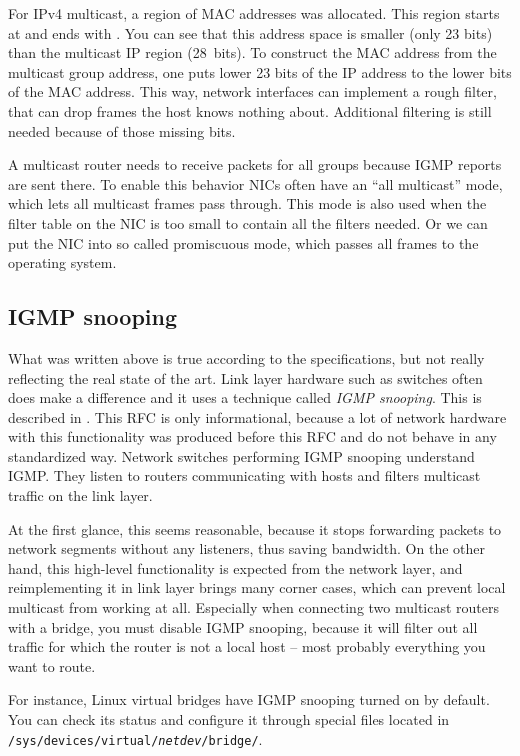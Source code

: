 For IPv4 multicast, a region of MAC addresses was allocated. This region starts
at  and ends with . You can see
that this address space is smaller (only 23 bits) than the multicast IP region
(28~bits). To construct the MAC address from the multicast group address, one
puts lower 23 bits of the IP address to the lower bits of the MAC address. This
way, network interfaces can implement a rough filter, that can drop frames the
host knows nothing about. Additional filtering is still needed because of those
missing bits.

A multicast router needs to receive packets for all groups because IGMP reports
are sent there. To enable this behavior NICs often have an ``all multicast''
mode, which lets all multicast frames pass through. This mode is also used when
the filter table on the NIC is too small to contain all the filters needed. Or
we can put the NIC into so called promiscuous mode, which passes all frames
to the operating system.

\subsection{IGMP snooping}

What was written above is true according to the specifications, but not really
reflecting the real state of the art. Link layer hardware such as switches often does
make a difference and it uses a technique called \emph{IGMP snooping}. This is described
in . This RFC is only informational, because a lot of network hardware with
this functionality was produced before this RFC and do not behave in any
standardized way. Network switches performing IGMP snooping understand IGMP. They
listen to routers communicating with hosts and filters multicast traffic on
the link layer.

At the first glance, this seems reasonable, because it stops forwarding packets
to network segments without any listeners, thus saving bandwidth. On the other
hand, this high-level functionality is expected from the network layer, and
reimplementing it in link layer brings many corner cases, which can prevent
local multicast from working at all. Especially when connecting two multicast
routers with a bridge, you must disable IGMP snooping, because it will filter
out all traffic for which the router is not a local host -- most probably
everything you want to route.

For instance, Linux virtual bridges have IGMP snooping turned on by default.
You can check its status and configure it through special files located in
\texttt{/sys/devices/virtual/{\it netdev\/}/bridge/}.

